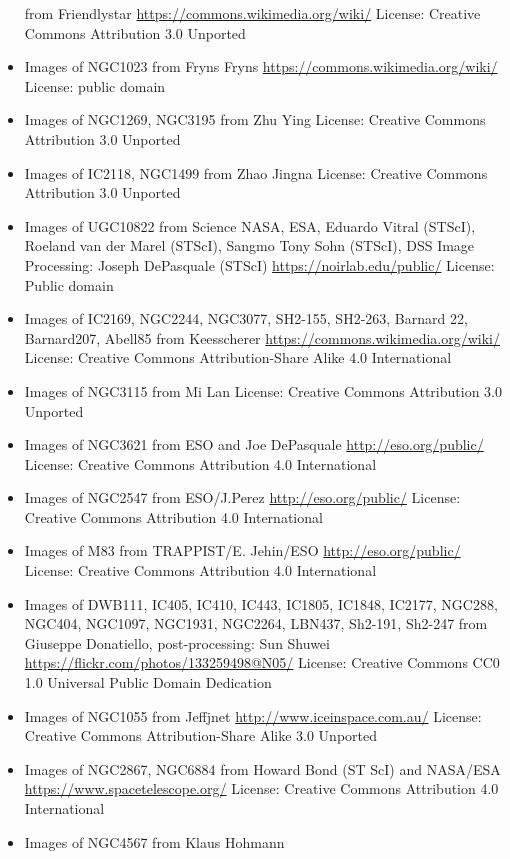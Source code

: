 \begin{itemize}
	 from Friendlystar
	 \url{https://commons.wikimedia.org/wiki/}
	 License: Creative Commons Attribution 3.0 Unported
\item Images of NGC1023
	 from Fryns Fryns
	 \url{https://commons.wikimedia.org/wiki/}
	 License: public domain
\item Images of NGC1269, NGC3195
	 from Zhu Ying
	 License: Creative Commons Attribution 3.0 Unported
\item Images of IC2118, NGC1499
	 from Zhao Jingna
	 License: Creative Commons Attribution 3.0 Unported
\item Images of UGC10822
	 from Science NASA, ESA, Eduardo Vitral (STScI), Roeland van der Marel (STScI), Sangmo Tony Sohn (STScI), DSS Image Processing: Joseph DePasquale (STScI)
	 \url{https://noirlab.edu/public/}
	 License: Public domain
\item Images of IC2169, NGC2244, NGC3077, SH2-155, SH2-263, Barnard 22, Barnard207,
	 Abell85
	 from Keesscherer
	 \url{https://commons.wikimedia.org/wiki/}
	 License: Creative Commons Attribution-Share Alike 4.0 International
\item Images of NGC3115
	 from Mi Lan
	 License: Creative Commons Attribution 3.0 Unported
\item Images of NGC3621
	 from ESO and Joe DePasquale
	 \url{http://eso.org/public/}
	 License: Creative Commons Attribution 4.0 International 
\item Images of NGC2547
	 from ESO/J.Perez
	 \url{http://eso.org/public/}
	 License: Creative Commons Attribution 4.0 International 
\item Images of M83
	 from TRAPPIST/E. Jehin/ESO
	 \url{http://eso.org/public/}
	 License: Creative Commons Attribution 4.0 International 
\item Images of DWB111, IC405, IC410, IC443, IC1805, IC1848, IC2177,
	 NGC288, NGC404, NGC1097, NGC1931, NGC2264, LBN437, Sh2-191, Sh2-247
	 from Giuseppe Donatiello, post-processing: Sun Shuwei
	 \url{https://flickr.com/photos/133259498@N05/}
	 License: Creative Commons CC0 1.0 Universal Public Domain Dedication
\item Images of NGC1055
	 from Jeffjnet
	 \url{http://www.iceinspace.com.au/}
	 License: Creative Commons Attribution-Share Alike 3.0 Unported
\item Images of NGC2867, NGC6884
	 from Howard Bond (ST ScI) and NASA/ESA
	 \url{https://www.spacetelescope.org/}
	 License: Creative Commons Attribution 4.0 International 
\item Images of NGC4567
	 from Klaus Hohmann

\end{itemize}
